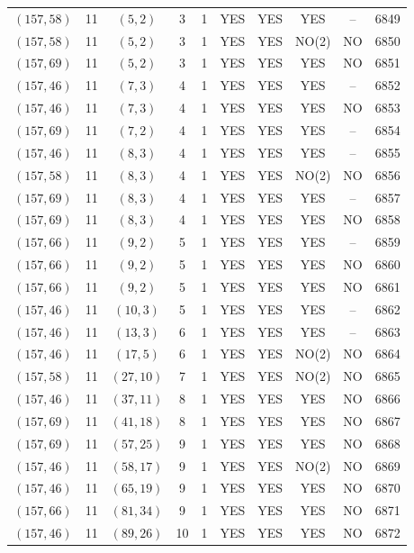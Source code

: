 \begin{longtable}{|c|c|c|c|c|c|c|c|c|c|}
$(157, 58)$ & 11 & $(5, 2)$ & 3 & 1 & YES & YES & YES & -- & 6849\\
$(157, 58)$ & 11 & $(5, 2)$ & 3 & 1 & YES & YES & NO(2) & NO & 6850\\
$(157, 69)$ & 11 & $(5, 2)$ & 3 & 1 & YES & YES & YES & NO & 6851\\
$(157, 46)$ & 11 & $(7, 3)$ & 4 & 1 & YES & YES & YES & -- & 6852\\
$(157, 46)$ & 11 & $(7, 3)$ & 4 & 1 & YES & YES & YES & NO & 6853\\
$(157, 69)$ & 11 & $(7, 2)$ & 4 & 1 & YES & YES & YES & -- & 6854\\
$(157, 46)$ & 11 & $(8, 3)$ & 4 & 1 & YES & YES & YES & -- & 6855\\
$(157, 58)$ & 11 & $(8, 3)$ & 4 & 1 & YES & YES & NO(2) & NO & 6856\\
$(157, 69)$ & 11 & $(8, 3)$ & 4 & 1 & YES & YES & YES & -- & 6857\\
$(157, 69)$ & 11 & $(8, 3)$ & 4 & 1 & YES & YES & YES & NO & 6858\\
$(157, 66)$ & 11 & $(9, 2)$ & 5 & 1 & YES & YES & YES & -- & 6859\\
$(157, 66)$ & 11 & $(9, 2)$ & 5 & 1 & YES & YES & YES & NO & 6860\\
$(157, 66)$ & 11 & $(9, 2)$ & 5 & 1 & YES & YES & YES & NO & 6861\\
$(157, 46)$ & 11 & $(10, 3)$ & 5 & 1 & YES & YES & YES & -- & 6862\\
$(157, 46)$ & 11 & $(13, 3)$ & 6 & 1 & YES & YES & YES & -- & 6863\\
$(157, 46)$ & 11 & $(17, 5)$ & 6 & 1 & YES & YES & NO(2) & NO & 6864\\
$(157, 58)$ & 11 & $(27, 10)$ & 7 & 1 & YES & YES & NO(2) & NO & 6865\\
$(157, 46)$ & 11 & $(37, 11)$ & 8 & 1 & YES & YES & YES & NO & 6866\\
$(157, 69)$ & 11 & $(41, 18)$ & 8 & 1 & YES & YES & YES & NO & 6867\\
$(157, 69)$ & 11 & $(57, 25)$ & 9 & 1 & YES & YES & YES & NO & 6868\\
$(157, 46)$ & 11 & $(58, 17)$ & 9 & 1 & YES & YES & NO(2) & NO & 6869\\
$(157, 46)$ & 11 & $(65, 19)$ & 9 & 1 & YES & YES & YES & NO & 6870\\
$(157, 66)$ & 11 & $(81, 34)$ & 9 & 1 & YES & YES & YES & NO & 6871\\
$(157, 46)$ & 11 & $(89, 26)$ & 10 & 1 & YES & YES & YES & NO & 6872\\

\end{longtable}
